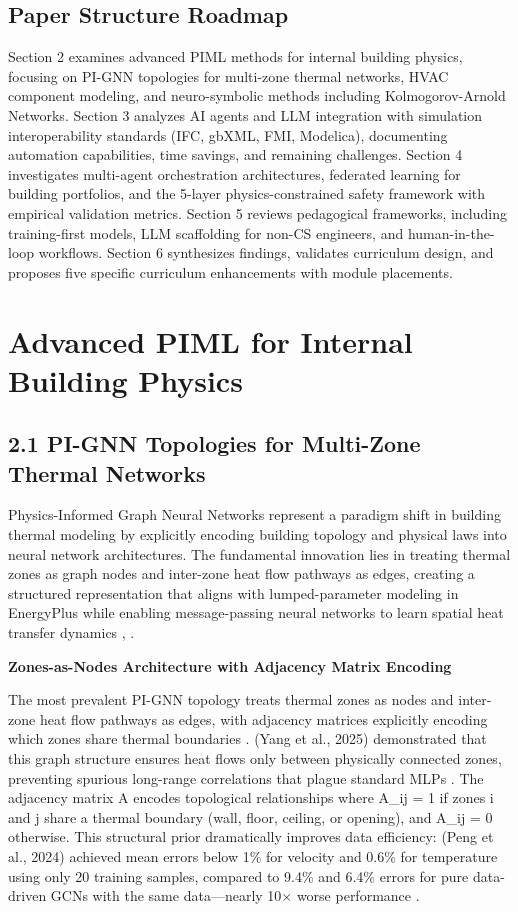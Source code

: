 \documentclass[12pt,a4paper]{article}
\begin{document}
\subsection{Paper Structure Roadmap}

Section 2 examines advanced PIML methods for internal building physics, focusing on PI-GNN topologies for multi-zone thermal networks, HVAC component modeling, and neuro-symbolic methods including Kolmogorov-Arnold Networks. Section 3 analyzes AI agents and LLM integration with simulation interoperability standards (IFC, gbXML, FMI, Modelica), documenting automation capabilities, time savings, and remaining challenges. Section 4 investigates multi-agent orchestration architectures, federated learning for building portfolios, and the 5-layer physics-constrained safety framework with empirical validation metrics. Section 5 reviews pedagogical frameworks, including training-first models, LLM scaffolding for non-CS engineers, and human-in-the-loop workflows. Section 6 synthesizes findings, validates curriculum design, and proposes five specific curriculum enhancements with module placements.



\section{Advanced PIML for Internal Building Physics}

\subsection{2.1 PI-GNN Topologies for Multi-Zone Thermal Networks}

Physics-Informed Graph Neural Networks represent a paradigm shift in building thermal modeling by explicitly encoding building topology and physical laws into neural network architectures. The fundamental innovation lies in treating thermal zones as graph nodes and inter-zone heat flow pathways as edges, creating a structured representation that aligns with lumped-parameter modeling in EnergyPlus while enabling message-passing neural networks to learn spatial heat transfer dynamics \cite{ref13}, \cite{ref14}.

\textbf{Zones-as-Nodes Architecture with Adjacency Matrix Encoding}

The most prevalent PI-GNN topology treats thermal zones as nodes and inter-zone heat flow pathways as edges, with adjacency matrices explicitly encoding which zones share thermal boundaries \cite{ref15}. (Yang et al., 2025) demonstrated that this graph structure ensures heat flows only between physically connected zones, preventing spurious long-range correlations that plague standard MLPs \cite{ref16}. The adjacency matrix A encodes topological relationships where A\_ij = 1 if zones i and j share a thermal boundary (wall, floor, ceiling, or opening), and A\_ij = 0 otherwise. This structural prior dramatically improves data efficiency: (Peng et al., 2024) achieved mean errors below 1\% for velocity and 0.6\% for temperature using only 20 training samples, compared to 9.4\% and 6.4\% errors for pure data-driven GCNs with the same data---nearly 10$\times$ worse performance \cite{ref17}.
\end{document}
